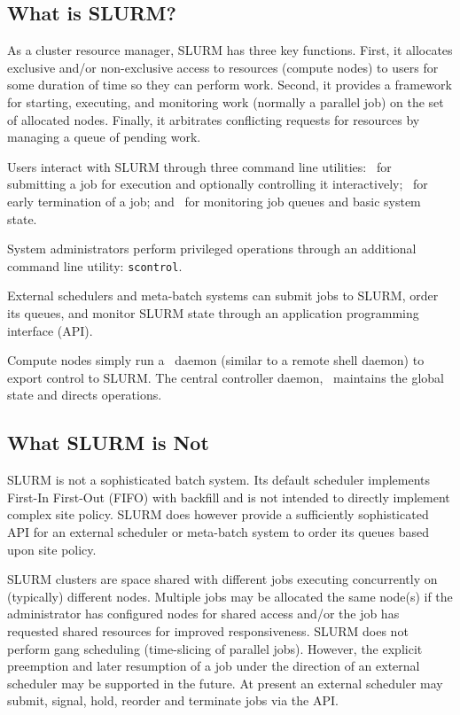 \subsection{What is SLURM?}

As a cluster resource manager, SLURM has three key functions.  First,
it allocates exclusive and/or non-exclusive access to resources (compute nodes) to users for 
some duration of time so they can perform work.  Second, it provides 
a framework for starting, executing, and monitoring work (normally a 
parallel job) on the set of allocated nodes.  Finally, it arbitrates 
conflicting requests for resources by managing a queue of pending work.

Users interact with SLURM through three command line utilities: 
\srun\ for submitting a job for execution and optionally controlling it
interactively; 
\scancel\ for early termination of a job; 
and \squeue\ for monitoring job queues and basic system state.

System administrators perform privileged operations through an additional
command line utility: {\tt scontrol}.

External schedulers and meta-batch systems can submit jobs to SLURM, 
order its queues, and monitor SLURM state through an application 
programming interface (API).

Compute nodes simply run a \slurmd\ daemon (similar to a remote shell 
daemon) to export control to SLURM.  The central controller daemon,
\slurmctld\, maintains the global state and directs operations.

\subsection{What SLURM is Not}

SLURM is not a sophisticated batch system.  Its default scheduler
implements First-In First-Out (FIFO) with backfill and is not 
intended to directly implement complex site policy.
SLURM does however provide a sufficiently sophisticated API for an external 
scheduler or meta-batch system to order its queues based upon site policy.

SLURM clusters are space shared with different jobs executing 
concurrently on (typically) different nodes. 
Multiple jobs may be allocated the same node(s) 
if the administrator has configured nodes for shared access and/or 
the job has requested shared resources for improved responsiveness.
SLURM does not perform gang scheduling (time-slicing 
of parallel jobs). However, the explicit preemption and later resumption 
of a job under the direction of an external scheduler may be supported 
in the future. At present an external scheduler may submit, signal, hold, 
reorder and terminate jobs via the API.

